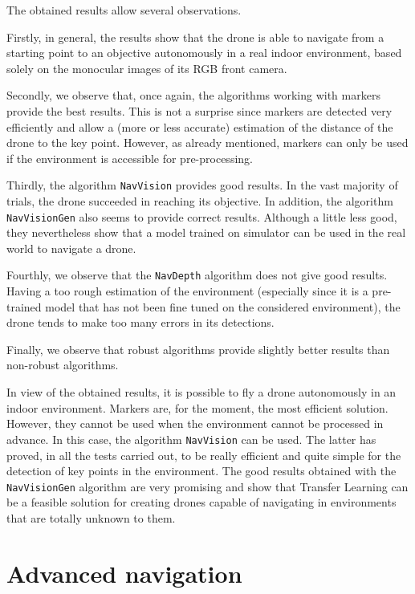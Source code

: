 The obtained results allow several observations.

Firstly, in general, the results show that the drone is able to navigate from a starting point to an objective autonomously in a real indoor environment, based solely on the monocular images of its RGB front camera.

Secondly, we observe that, once again, the algorithms working with markers provide the best results. This is not a surprise since markers are detected very efficiently and allow a (more or less accurate) estimation of the distance of the drone to the key point. However, as already mentioned, markers can only be used if the environment is accessible for pre-processing.

Thirdly, the algorithm \texttt{NavVision} provides good results. In the vast majority of trials, the drone succeeded in reaching its objective. In addition, the algorithm \texttt{NavVisionGen} also seems to provide correct results. Although a little less good, they nevertheless show that a model trained on simulator can be used in the real world to navigate a drone.

Fourthly, we observe that the \texttt{NavDepth} algorithm does not give good results. Having a too rough estimation of the environment (especially since it is a pre-trained model that has not been fine tuned on the considered environment), the drone tends to make too many errors in its detections.

Finally, we observe that robust algorithms provide slightly better results than non-robust algorithms.

In view of the obtained results, it is possible to fly a drone autonomously in an indoor environment. Markers are, for the moment, the most efficient solution. However, they cannot be used when the environment cannot be processed in advance. In this case, the algorithm \texttt{NavVision} can be used. The latter has proved, in all the tests carried out, to be really efficient and quite simple for the detection of key points in the environment. The good results obtained with the \texttt{NavVisionGen} algorithm are very promising and show that Transfer Learning can be a feasible solution for creating drones capable of navigating in environments that are totally unknown to them.

\section{Advanced navigation}

